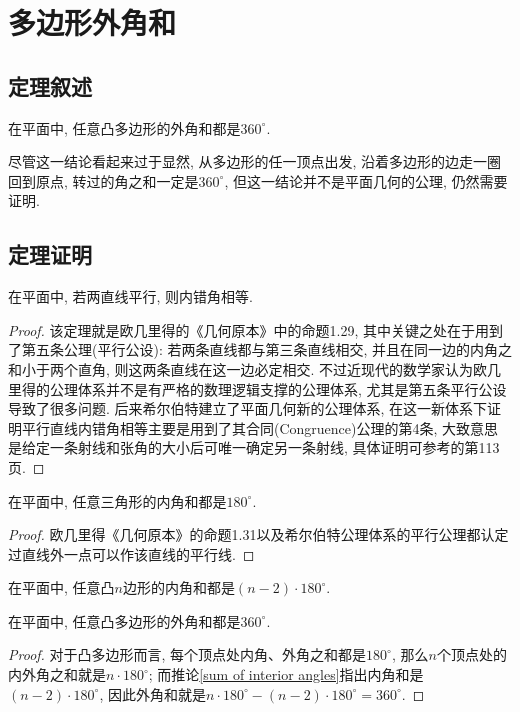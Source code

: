 \documentclass[main]{subfiles}
\begin{document}
\renewcommand{\filename}{26. 多边形外角和}%
\section{多边形外角和}
\subsection{定理叙述}
在平面中, 任意凸多边形的外角和都是$360^{\circ}$.

尽管这一结论看起来过于显然, 从多边形的任一顶点出发, 沿着多边形的边走一圈回到原点, 转过的角之和一定是$360^{\circ}$, 但这一结论并不是平面几何的公理, 仍然需要证明.
\subsection{定理证明}
\begin{theorem}\label{key}
	在平面中, 若两直线平行, 则内错角相等.
\end{theorem}
\begin{proof}
	该定理就是欧几里得的《几何原本》\cite{Euclid}中的命题1.29, 其中关键之处在于用到了{\kaishu 第五条公理(平行公设)}: 若两条直线都与第三条直线相交, 并且在同一边的内角之和小于两个直角, 则这两条直线在这一边必定相交. 不过近现代的数学家认为欧几里得的公理体系并不是有严格的数理逻辑支撑的公理体系, 尤其是第五条平行公设导致了很多问题. 后来希尔伯特建立了平面几何新的公理体系\cite{Hilbert}, 在这一新体系下证明平行直线内错角相等主要是用到了其{\kaishu 合同(Congruence)公理的第4条}, 大致意思是给定一条射线和张角的大小后可唯一确定另一条射线, 具体证明可参考\cite{Hartshorne}的第113页.
\end{proof}

\begin{theorem}
	在平面中, 任意三角形的内角和都是$180^{\circ}$.
\end{theorem}
\begin{proof}
	欧几里得《几何原本》\cite{Euclid}的命题1.31以及希尔伯特公理体系\cite{Hilbert}的平行公理都认定过直线外一点可以作该直线的平行线.
\end{proof}

\begin{corollary}\label{sum of interior angles}
	在平面中, 任意凸$n$边形的内角和都是$(n-2)\cdot 180^{\circ}$.
\end{corollary}

\begin{corollary}\label{sum of exterior angles}
	在平面中, 任意凸多边形的外角和都是$360^{\circ}$.
\end{corollary}
\begin{proof}
	对于凸多边形而言, 每个顶点处内角、外角之和都是$180^{\circ}$, 那么$n$个顶点处的内外角之和就是$n\cdot 180^{\circ}$; 而推论\ref{sum of interior angles}指出内角和是$(n-2)\cdot 180^{\circ}$, 因此外角和就是$n\cdot 180^{\circ}-(n-2)\cdot 180^{\circ}=360^{\circ}$.
\end{proof}
\end{document}
